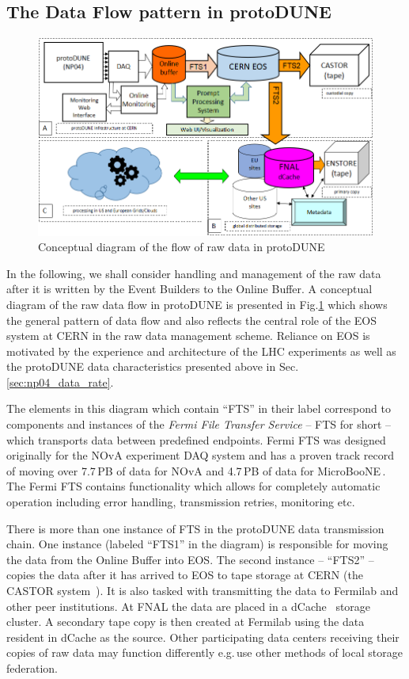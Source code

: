 \documentclass[a4paper]{jpconf}
\newcommand{\pd}{protoDUNE\xspace}
\begin{document}
\subsection{The Data Flow pattern in \pd}
\label{sec:flow}
\begin{figure}[tbh]
\centering\includegraphics[width=0.85\linewidth]{figures/protoDUNE_data_flow_2017_v2.png}
\caption{\label{fig:raw_concept}Conceptual diagram of the flow of raw data in \pd}
\end{figure}

\noindent In the following, we shall consider handling and management of the raw data after it is
written by the Event Builders to the Online Buffer.  A conceptual diagram of the raw data
flow in \pd is presented in Fig.\ref{fig:raw_concept} which shows the general pattern of data flow
and also reflects the central role of the EOS system at CERN \cite{castoreos} in the raw data management scheme.
Reliance on EOS is motivated by the experience and architecture of the LHC experiments
as well as the \pd data characteristics presented above in Sec.\,\ref{sec:np04_data_rate}.

The elements in this diagram which contain ``FTS'' in their label correspond to components and
instances of the \textit{Fermi File Transfer Service} -- FTS for short \cite{sam,fts} -- which transports
data between predefined endpoints. Fermi FTS was designed originally for the NOvA experiment
\cite{nova} DAQ system and has a proven track record of moving over 7.7\,PB of data for NOvA
and 4.7\,PB of data for MicroBooNE\,\cite{uboone}.
The Fermi FTS contains functionality which allows for completely automatic operation
including error handling, transmission retries, monitoring etc.

There is more than one instance of FTS in the \pd data transmission chain. One instance (labeled ``FTS1''
in the diagram) is responsible for moving the data from the Online Buffer into EOS. The second instance
-- ``FTS2'' --  copies the data after it has arrived to EOS to tape storage at CERN (the CASTOR
system~\cite{castoreos}). It is also tasked with transmitting the data to Fermilab  and other peer
institutions. At FNAL the data are placed in a dCache~\cite{dcache} storage cluster. A secondary
tape copy is then created at Fermilab using the data resident in dCache as the source.
Other participating data centers receiving their copies of raw data may function differently
e.g.\,use other methods of local storage federation.
\end{document}
